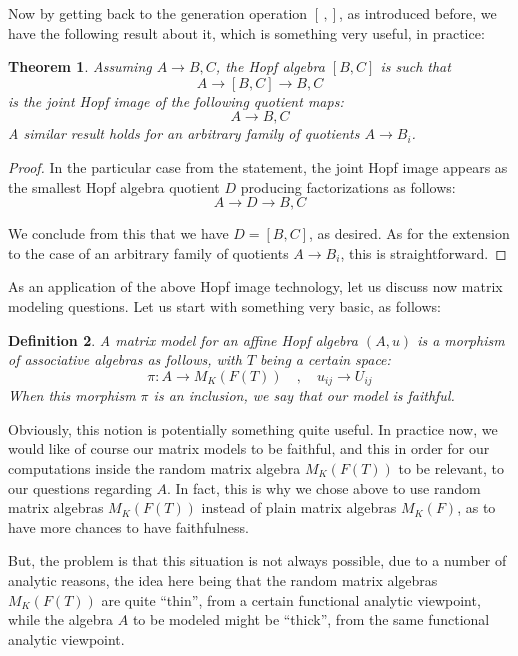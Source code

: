\documentclass[12pt]{amsbook}
\newtheorem{theorem}{Theorem}[chapter]
\newtheorem{definition}[theorem]{Definition}
\begin{document}
\bigskip

Now by getting back to the generation operation $[\,,]$, as introduced before, we have the following result about it, which is something very useful, in practice:


\begin{theorem}
Assuming $A\to B,C$, the Hopf algebra $[B,C]$ is such that
$$A\to [B,C]\to B,C$$
is the joint Hopf image of the following quotient maps:
$$A\to B,C$$
A similar result holds for an arbitrary family of quotients $A\to B_i$.
\end{theorem}

\begin{proof}
In the particular case from the statement, the joint Hopf image appears as the smallest Hopf algebra quotient $D$ producing factorizations as follows:
$$A\to D\to B,C$$

We conclude from this that we have $D=[B,C]$, as desired. As for the extension to the case of an arbitrary family of quotients $A\to B_i$, this is straightforward.
\end{proof}

As an application of the above Hopf image technology, let us discuss now matrix modeling questions. Let us start with something very basic, as follows:


\begin{definition}
A matrix model for an affine Hopf algebra $(A,u)$ is a morphism of associative algebras as follows, with $T$ being a certain space:
$$\pi:A\to M_K(F(T))\quad,\quad u_{ij}\to U_{ij}$$
When this morphism $\pi$ is an inclusion, we say that our model is faithful.
\end{definition}

Obviously, this notion is potentially something quite useful. In practice now, we would like of course our matrix models to be faithful, and this in order for our computations inside the random matrix algebra $M_K(F(T))$ to be relevant, to our questions regarding $A$. In fact, this is why we chose above to use random matrix algebras $M_K(F(T))$ instead of plain matrix algebras $M_K(F)$, as to have more chances to have faithfulness.

\bigskip

But, the problem is that this situation is not always possible, due to a number of analytic reasons, the idea here being that the random matrix algebras $M_K(F(T))$ are quite ``thin'', from a certain functional analytic viewpoint, while the algebra $A$ to be modeled might be ``thick'', from the same functional analytic viewpoint.
\end{document}
